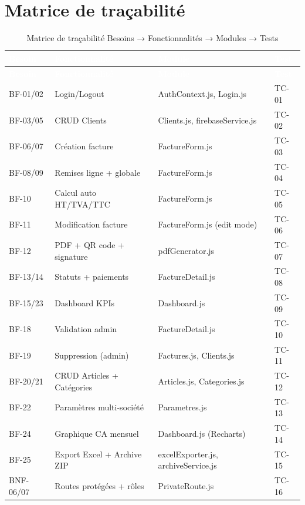 \section{Matrice de traçabilité}

\begin{landscape}
\begin{longtable}{|l|X|l|l|}
\caption{Matrice de traçabilité Besoins → Fonctionnalités → Modules → Tests} \label{tab:tracabilite} \\
\hline
\rowcolor{emsiblue}\textcolor{white}{\textbf{Besoin}} & \textcolor{white}{\textbf{Fonctionnalité}} & \textcolor{white}{\textbf{Module}} & \textcolor{white}{\textbf{Test}} \\
\hline
\endfirsthead
\hline
\rowcolor{emsiblue}\textcolor{white}{\textbf{Besoin}} & \textcolor{white}{\textbf{Fonctionnalité}} & \textcolor{white}{\textbf{Module}} & \textcolor{white}{\textbf{Test}} \\
\hline
\endhead
BF-01/02 & Login/Logout & AuthContext.js, Login.js & TC-01 \\
BF-03/05 & CRUD Clients & Clients.js, firebaseService.js & TC-02 \\
BF-06/07 & Création facture & FactureForm.js & TC-03 \\
BF-08/09 & Remises ligne + globale & FactureForm.js & TC-04 \\
BF-10 & Calcul auto HT/TVA/TTC & FactureForm.js & TC-05 \\
BF-11 & Modification facture & FactureForm.js (edit mode) & TC-06 \\
BF-12 & PDF + QR code + signature & pdfGenerator.js & TC-07 \\
BF-13/14 & Statuts + paiements & FactureDetail.js & TC-08 \\
BF-15/23 & Dashboard KPIs & Dashboard.js & TC-09 \\
BF-18 & Validation admin & FactureDetail.js & TC-10 \\
BF-19 & Suppression (admin) & Factures.js, Clients.js & TC-11 \\
BF-20/21 & CRUD Articles + Catégories & Articles.js, Categories.js & TC-12 \\
BF-22 & Paramètres multi-société & Parametres.js & TC-13 \\
BF-24 & Graphique CA mensuel & Dashboard.js (Recharts) & TC-14 \\
BF-25 & Export Excel + Archive ZIP & excelExporter.js, archiveService.js & TC-15 \\
BNF-06/07 & Routes protégées + rôles & PrivateRoute.js & TC-16 \\
\hline
\end{longtable}
\end{landscape}
